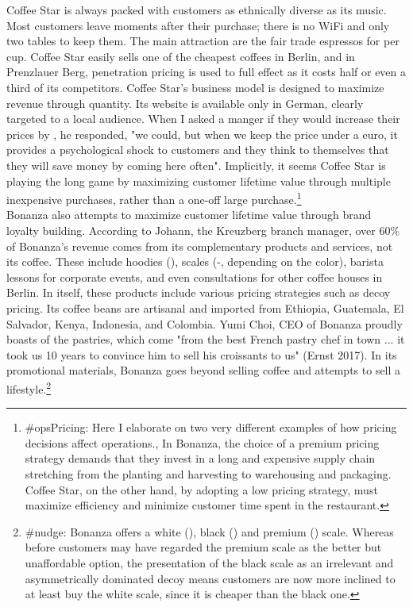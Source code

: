 \documentclass{article}
\begin{document}
Coffee Star is always packed with customers as ethnically diverse as its music. Most customers leave moments after their purchase; there is no WiFi and only two tables to keep them. The main attraction are the fair trade espressos for  per cup. Coffee Star easily sells one of the cheapest coffees in Berlin, and in Prenzlauer Berg,  penetration pricing is used to full effect as it costs half or even a third of its competitors. Coffee Star's business model is designed to maximize revenue through quantity. Its website is available only in German, clearly targeted to a local audience. When I asked a manger if they would increase their prices by , he responded, "we could, but when we keep the price under a euro, it provides a psychological shock to customers and they think to themselves that they will save money by coming here often". Implicitly, it seems Coffee Star is playing the long game by maximizing customer lifetime value through multiple inexpensive purchases, rather than a one-off large purchase.\footnote{\#opsPricing: Here I elaborate on two very different examples of how pricing decisions affect operations., In Bonanza, the choice of a premium pricing strategy demands that they invest in a long and expensive supply chain stretching from the planting and harvesting to warehousing and packaging. Coffee Star, on the other hand, by adopting a low pricing strategy, must maximize efficiency and minimize customer time spent in the restaurant.}\\

Bonanza also attempts to maximize customer lifetime value through brand loyalty building. According to Johann, the Kreuzberg branch manager, over 60\% of Bonanza's revenue comes from its complementary products and services, not its coffee. These include hoodies (), scales (-, depending on the color), barista lessons for corporate events, and even consultations for other coffee houses in Berlin. In itself, these products include various pricing strategies such as decoy pricing. Its coffee beans are artisanal and imported from Ethiopia, Guatemala, El Salvador, Kenya, Indonesia, and Colombia. Yumi Choi, CEO of Bonanza proudly boasts of the pastries, which come "from the best French pastry chef in town ... it took us 10 years to convince him to sell his croissants to us" (Ernst 2017). In its promotional materials, Bonanza goes beyond selling coffee and attempts to sell a lifestyle.\footnote{\#nudge: Bonanza offers a white (), black () and premium () scale. Whereas before customers may have regarded the premium scale as the better but unaffordable option, the presentation of the black scale as an irrelevant and asymmetrically dominated decoy means customers are now more inclined to at least buy the white scale, since it is cheaper than the black one.} 
\end{document}
